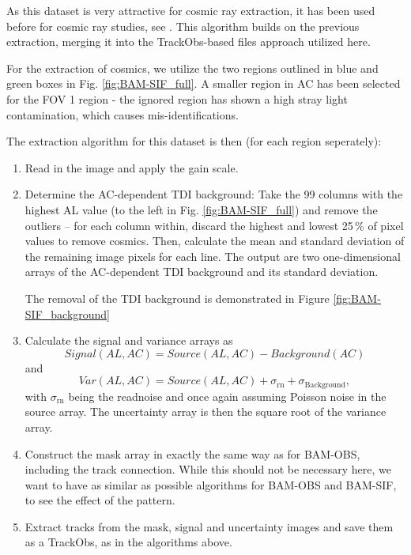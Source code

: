 \documentclass[a4paper, 11pt]{article}
\begin{document}
As this dataset is very attractive for cosmic ray extraction, it has been used before for cosmic ray studies, see \cite{GAIA-DE-TN-ESAC-RKO-033}. This algorithm builds on the previous extraction, merging it into the TrackObs-based files approach utilized here.

For the extraction of cosmics, we utilize the two regions outlined in blue and green boxes in Fig. \ref{fig:BAM-SIF_full}. A smaller region in AC has been selected for the FOV 1 region - the ignored region has shown a high stray light contamination, which causes mis-identifications.

The extraction algorithm for this dataset is then (for each region seperately):
\begin{enumerate}
  \item Read in the image and apply the gain scale.
  \item Determine the AC-dependent TDI background: Take the 99 columns with the highest AL value (to the left in Fig. \ref{fig:BAM-SIF_full}) and remove the outliers -- for each column within, discard the highest and lowest 25\,\% of pixel values to remove cosmics. Then, calculate the mean and standard deviation of the remaining image pixels for each line. The output are two one-dimensional arrays of the AC-dependent TDI background and its standard deviation.

    The removal of the TDI background is demonstrated in Figure \ref{fig:BAM-SIF_background}
  \item Calculate the signal and variance arrays as
    \begin{equation}
      Signal\left( AL,AC \right) = Source\left( AL,AC \right) - Background\left(AC \right)
    \end{equation}
    and
    \begin{equation}
      Var\left( AL,AC \right) = Source\left( AL,AC \right) + \sigma_\mathrm{rn} + \sigma_\mathrm{Background},
    \end{equation}
    with $\sigma_\mathrm{rn}$ being the readnoise and once again assuming Poisson noise in the source array. The uncertainty array is then the square root of the variance array.
  \item Construct the mask array in exactly the same way as for BAM-OBS, including the track connection. While this should not be necessary here, we want to have as similar as possible algorithms for BAM-OBS and BAM-SIF, to see the effect of the pattern.
  \item Extract tracks from the mask, signal and uncertainty images and save them as a TrackObs, as in the algorithms above.
\end{enumerate}
\end{document}
